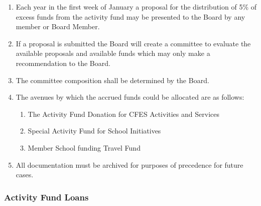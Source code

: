 \begin{enumerate}
 \item
  Each year in the first week of January a proposal for the distribution of 5\% of excess funds from the activity fund may be presented to the Board by any member or Board Member.
 \item
  If a proposal is submitted the Board will create a committee to evaluate the available proposals and available funds which may only make a recommendation to the Board.
 \item
  The committee composition shall be determined by the Board.
 \item
  The avenues by which the accrued funds could be allocated are as follows:

  \begin{enumerate}
   \item
    The Activity Fund Donation for CFES Activities and Services
   \item
    Special Activity Fund for School Initiatives
   \item
    Member School funding Travel Fund
  \end{enumerate}

 \item
  All documentation must be archived for purposes of precedence for future cases.
\end{enumerate}

\subsubsection{Activity Fund Loans}
\label{activity-fund-loans}

